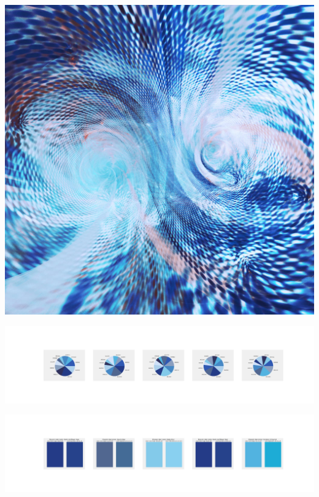 \documentclass[11pt]{article}
\begin{document}
\begin{landscape}
    \begin{center}
    \includegraphics[width=\textwidth]{./nbimg/file (292).jpg}
    \end{center}

    \begin{center}
    \includegraphics[width=250mm]{./nbimg/pie-214.jpg}
    \end{center}

    \begin{center}
    \includegraphics[width=250mm]{./nbimg/peak-214.jpg}
    \end{center}
    


\end{landscape}
\end{document}
